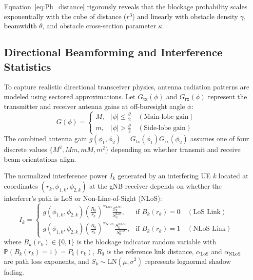 Equation~\eqref{eq:Pb_distance} rigorously reveals that the blockage probability scales exponentially with the cube of distance ($r^3$) and linearly with obstacle density $\gamma$, beamwidth $\theta$, and obstacle cross-section parameter $\kappa$.

\subsection{Directional Beamforming and Interference Statistics}
To capture realistic directional transceiver physics, antenna radiation patterns are modeled using sectored approximations. Let $G_{\mathrm{tx}}(\phi)$ and $G_{\mathrm{rx}}(\phi)$ represent the transmitter and receiver antenna gains at off-boresight angle $\phi$:
\begin{equation}
    G(\phi) = \begin{cases}
        M, & |\phi| \le \frac{\theta}{2} \quad (\text{Main-lobe gain}) \\
        m, & |\phi| > \frac{\theta}{2} \quad (\text{Side-lobe gain})
    \end{cases}
\end{equation}
The combined antenna gain $g(\phi_1, \phi_2) = G_{\mathrm{tx}}(\phi_1) G_{\mathrm{rx}}(\phi_2)$ assumes one of four discrete values $\{M^2, M m, m M, m^2\}$ depending on whether transmit and receive beam orientations align.

The normalized interference power $I_k$ generated by an interfering UE $k$ located at coordinates $(r_k, \phi_{1, k}, \phi_{2, k})$ at the gNB receiver depends on whether the interferer's path is LoS or Non-Line-of-Sight (NLoS):
\begin{equation}
    I_k = \begin{cases}
        g(\phi_{1, k}, \phi_{2, k}) \left( \frac{R_0}{r_k} \right)^{\alpha_{\mathrm{LoS}}} \frac{S_k^{\mathrm{LoS}}}{S_0^{\mathrm{LoS}}}, & \text{if } B_k(r_k) = 0 \quad (\text{LoS Link}) \\
        g(\phi_{1, k}, \phi_{2, k}) \left( \frac{R_0}{r_k} \right)^{\alpha_{\mathrm{NLoS}}} \frac{S_k^{\mathrm{NLoS}}}{S_0^{\mathrm{LoS}}}, & \text{if } B_k(r_k) = 1 \quad (\text{NLoS Link})
    \end{cases}
\end{equation}
where $B_k(r_k) \in \{0, 1\}$ is the blockage indicator random variable with $\mathbb{P}(B_k(r_k) = 1) = P_b(r_k)$, $R_0$ is the reference link distance, $\alpha_{\mathrm{LoS}}$ and $\alpha_{\mathrm{NLoS}}$ are path loss exponents, and $S_k \sim \mathrm{LN}(\mu, \sigma^2)$ represents lognormal shadow fading.

